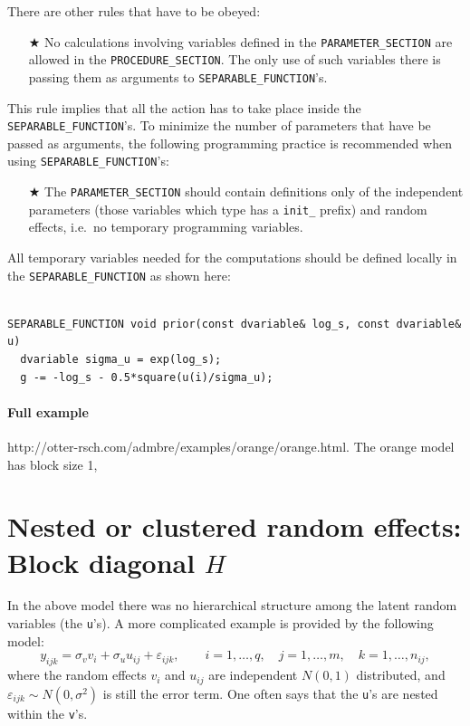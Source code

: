 \documentclass[12pt,letter,reqno]{book}
\begin{document}
There are other rules that have to be obeyed:
\begin{itemize}
  \item[$\bigstar$] No calculations involving variables defined in the \texttt{PARAMETER\_SECTION} 
		  are allowed in the \texttt{PROCEDURE\_SECTION}. The only use of such variables there 
			is passing them as arguments to \texttt{SEPARABLE\_FUNCTION}'s.
\end{itemize}
This rule implies that all the action has to take place inside the \texttt{SEPARABLE\_FUNCTION}'s.
To minimize the number of parameters that have be passed as arguments, the following programming
practice is recommended when using \texttt{SEPARABLE\_FUNCTION}'s:
\begin{itemize}
  \item[$\bigstar$] The \texttt{PARAMETER\_SECTION} should contain definitions only of 
		    the independent parameters (those variables which type has 
		    a \texttt{init\_} prefix) and random effects, i.e.~no temporary 
		    programming variables.
\end{itemize}
All temporary variables needed for the computations should be defined locally in
the \texttt{SEPARABLE\_FUNCTION} as shown here:
\begin{lstlisting}	

SEPARABLE_FUNCTION void prior(const dvariable& log_s, const dvariable& u)
  dvariable sigma_u = exp(log_s);
  g -= -log_s - 0.5*square(u(i)/sigma_u);

\end{lstlisting}

\paragraph{Full example} http://otter-rsch.com/admbre/examples/orange/orange.html.
The orange model has block size 1, 


\section{Nested or clustered random effects: Block diagonal $H$}
\label{sec:nested}
In the above model there was no hierarchical structure among the 
latent random variables (the \texttt{u}'s). A more complicated example
is provided by the following model:
\[
  y_{ijk}= \sigma_v v_{i} + \sigma_u u_{ij}+\varepsilon_{ijk},
            \qquad i=1,\ldots ,q,\quad j=1,\ldots ,m,\quad k=1,\ldots ,n_{ij},
\]
where the random effects $v_{i}$ and $u_{ij}$ are independent $N(0,1)$ distributed,
and $\varepsilon_{ijk}\sim N(0,\sigma^2)$ is still the error term. 
One often says that the \texttt{u}'s are nested within the \texttt{v}'s.
\end{document}
